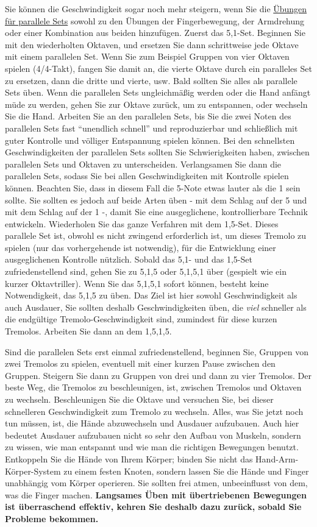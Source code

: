 Sie können die Geschwindigkeit sogar noch mehr steigern, wenn Sie die \hyperlink{c1iii7b}{Übungen für parallele Sets} sowohl zu den Übungen der Fingerbewegung, der Armdrehung oder einer Kombination aus beiden hinzufügen.
Zuerst das 5,1-Set.
Beginnen Sie mit den wiederholten Oktaven, und ersetzen Sie dann schrittweise jede Oktave mit einem parallelen Set.
Wenn Sie zum Beispiel Gruppen von vier Oktaven spielen (4/4-Takt), fangen Sie damit an, die vierte Oktave durch ein paralleles Set zu ersetzen, dann die dritte und vierte, usw.
Bald sollten Sie alles als parallele Sets üben.
Wenn die parallelen Sets ungleichmäßig werden oder die Hand anfängt müde zu werden, gehen Sie zur Oktave zurück, um zu entspannen, oder wechseln Sie die Hand.
Arbeiten Sie an den parallelen Sets, bis Sie die zwei Noten des parallelen Sets fast \enquote{unendlich schnell} und reproduzierbar und schließlich mit guter Kontrolle und völliger Entspannung spielen können.
Bei den schnellsten Geschwindigkeiten der parallelen Sets sollten Sie Schwierigkeiten haben, zwischen parallelen Sets und Oktaven zu unterscheiden.
Verlangsamen Sie dann die parallelen Sets, sodass Sie bei allen Geschwindigkeiten mit Kontrolle spielen können.
Beachten Sie, dass in diesem Fall die 5-Note etwas lauter als die 1 sein sollte.
Sie sollten es jedoch auf beide Arten üben - mit dem Schlag auf der 5 und mit dem Schlag auf der 1 -, damit Sie eine ausgeglichene, kontrollierbare Technik entwickeln.
Wiederholen Sie das ganze Verfahren mit dem 1,5-Set.
Dieses parallele Set ist, obwohl es nicht zwingend erforderlich ist, um dieses Tremolo zu spielen (nur das vorhergehende ist notwendig), für die Entwicklung einer ausgeglichenen Kontrolle nützlich.
Sobald das 5,1- und das 1,5-Set zufriedenstellend sind, gehen Sie zu 5,1,5 oder 5,1,5,1 über (gespielt wie ein kurzer Oktavtriller).
Wenn Sie das 5,1,5,1 sofort können, besteht keine Notwendigkeit, das 5,1,5 zu üben.
Das Ziel ist hier sowohl Geschwindigkeit als auch Ausdauer, Sie sollten deshalb Geschwindigkeiten üben, die \textit{viel} schneller als die endgültige Tremolo-Geschwindigkeit sind, zumindest für diese kurzen Tremolos.
Arbeiten Sie dann an dem 1,5,1,5.

Sind die parallelen Sets erst einmal zufriedenstellend, beginnen Sie, Gruppen von zwei Tremolos zu spielen, eventuell mit einer kurzen Pause zwischen den Gruppen.
Steigern Sie dann zu Gruppen von drei und dann zu vier Tremolos.
Der beste Weg, die Tremolos zu beschleunigen, ist, zwischen Tremolos und Oktaven zu wechseln.
Beschleunigen Sie die Oktave und versuchen Sie, bei dieser schnelleren Geschwindigkeit zum Tremolo zu wechseln.
Alles, was Sie jetzt noch tun müssen, ist, die Hände abzuwechseln und Ausdauer aufzubauen.
Auch hier bedeutet Ausdauer aufzubauen nicht so sehr den Aufbau von Muskeln, sondern zu wissen, wie man entspannt und wie man die richtigen Bewegungen benutzt.
Entkoppeln Sie die Hände von Ihrem Körper; binden Sie nicht das Hand-Arm-Körper-System zu einem festen Knoten, sondern lassen Sie die Hände und Finger unabhängig vom Körper operieren.
Sie sollten frei atmen, unbeeinflusst von dem, was die Finger machen.
\textbf{Langsames Üben mit übertriebenen Bewegungen ist überraschend effektiv, kehren Sie deshalb dazu zurück, sobald Sie Probleme bekommen.}

